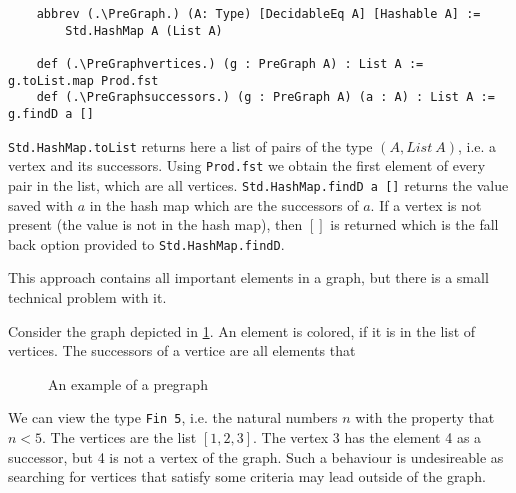 \begin{lstlisting}
    abbrev (.\PreGraph.) (A: Type) [DecidableEq A] [Hashable A] := 
        Std.HashMap A (List A)

    def (.\PreGraphvertices.) (g : PreGraph A) : List A := g.toList.map Prod.fst
    def (.\PreGraphsuccessors.) (g : PreGraph A) (a : A) : List A := g.findD a []
\end{lstlisting}

\lstinline|Std.HashMap.toList| returns here a list of pairs of the type $(A, List\ A)$, i.e. a vertex and its successors. Using \lstinline|Prod.fst| we obtain the first element of every pair in the list, which are all vertices. \lstinline|Std.HashMap.findD a []| returns the value saved with $a$ in the hash map which are the successors of $a$. If a vertex is not present (the value is not in the hash map), then $[]$ is returned which is the fall back option provided to  \lstinline|Std.HashMap.findD|.

This approach contains all important elements in a graph, but there is a small technical problem with it. 

\begin{example}
    
    Consider the graph depicted in \cref{ex:counterexampleGraph}. An element is colored, if it is in the list of vertices. The successors of a vertice are all elements that 

\begin{figure}
    \centering
    \caption{An example of a pregraph}      
    \label{ex:counterexampleGraph}

\end{figure}
    We can view the type \lstinline|Fin 5|, i.e. the natural numbers $n$ with the property that $n<5$. The vertices are the list $[1,2,3]$. The vertex 3 has the element 4 as a successor, but 4 is not a vertex of the graph. Such a behaviour is undesireable as searching for vertices that satisfy some criteria may lead outside of the graph.
\end{example}

